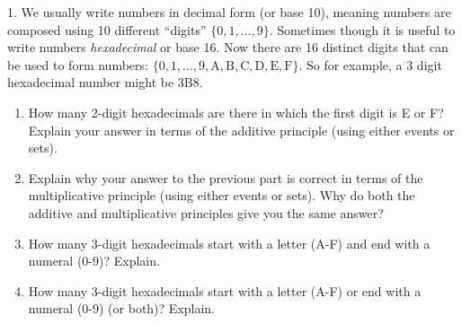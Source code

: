 \documentclass[10pt,]{book}
\theoremstyle{plain}
\theoremstyle{definition}
\theoremstyle{definition}
\theoremstyle{definition}
\numberwithin{equation}{section}
\begin{document}
\begin{exerciselist}
\item[1.]\hypertarget{exercise-124}{}
            We usually write numbers in decimal form (or base 10), meaning numbers are composed using 10 different ``digits'' \(\{0,1,\ldots, 9\}\). Sometimes though it is useful to write numbers \emph{hexadecimal} or base 16. Now there are 16 distinct digits that can be used to form numbers: \(\{0, 1, \ldots, 9, \mathrm{A, B, C, D, E, F}\}\). So for example, a 3 digit hexadecimal number might be 3B8.
\leavevmode%
\begin{enumerate}[label=(\alph*)]
\item\hypertarget{li-776}{}
                How many 2-digit hexadecimals are there in which the first digit is E or F? Explain your answer in terms of the additive principle (using either events or sets).

                
\item\hypertarget{li-777}{}
                Explain why your answer to the previous part is correct in terms of the multiplicative principle (using either events or sets). Why do both the additive and multiplicative principles give you the same answer?

                
\item\hypertarget{li-778}{}
                How many 3-digit hexadecimals start with a letter (A-F) and end with a numeral (0-9)? Explain.

                
\item\hypertarget{li-779}{}
                How many 3-digit hexadecimals start with a letter (A-F) or end with a numeral (0-9) (or both)? Explain.


\end{enumerate}
\end{exerciselist}
\end{document}
